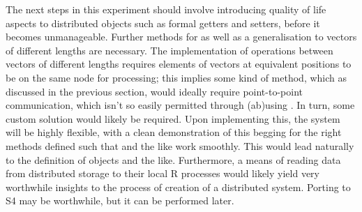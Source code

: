 The next steps in this experiment should involve introducing quality of life aspects to distributed objects such as formal getters and setters, before it becomes unmanageable.
Further methods for  as well as a generalisation to vectors of different lengths are necessary.
The implementation of operations between vectors of different lengths requires elements of vectors at equivalent positions to be on the same node for processing; this implies some kind of  method, which as discussed in the previous section, would ideally require point-to-point communication, which isn't so easily permitted through (ab)using .
In turn, some custom solution would likely be required.
Upon implementing this, the system will be highly flexible, with a clean demonstration of this begging for the right methods defined such that  and the like work smoothly.
This would lead naturally to the definition of  objects and the like.
Furthermore, a means of reading data from distributed storage to their local R processes would likely yield very worthwhile insights to the process of creation of a distributed \R{} system.
Porting to S4 may be worthwhile, but it can be performed later.

